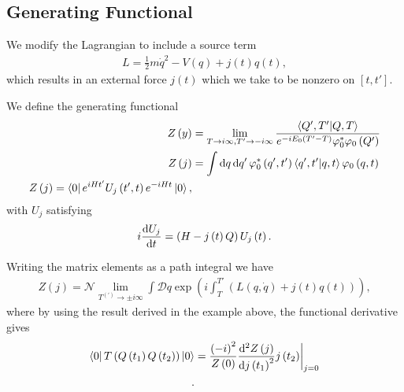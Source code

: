 \subsection{Generating Functional}

We modify the Lagrangian to include a source term
\begin{align*}
    L = \frac{1}{2}m\dot{q}^2 - V\left( q \right) + j\left( t \right) q\left( t \right) 
,\end{align*}
which results in an external force $j\left( t \right) $ which we take to be nonzero on $\left[ t,t' \right] $.

We define the generating functional
\begin{align*}
    Z\left( y \right) &= \lim_{T \to i \infty, T' \to -i\infty} \frac{\bra{Q',T'}\ket{Q,T}}{e^{-i E_0 \left( T' - T \right) }\phi_0^{*} \phi_0 \left( Q' \right) }\\
    Z\left( j \right) &= \int \dd{q} \dd{q'} \phi_0^{*}\left( q',t' \right) \bra{q', t'} \ket{q,t} \phi_0 \left( q,t \right)  \\
    Z\left( j \right) = \bra{0} e^{i Ht'} U_j \left( t',t \right) e^{-i H t} \ket{0}
,\end{align*}
with $U_j$ satisfying
\begin{align*}
    i \dv{U_j}{t} = \left( H - j\left( t \right) Q \right) U_j \left( t \right)
.\end{align*}

Writing the matrix elements as a path integral we have
\begin{align*}
    Z\left( j \right) = \mathcal{N} \lim_{T^{\left( ' \right) } \to \pm i\infty} \int \mathcal{D}q \exp \left( i \int_T^{T'} \left( L\left( q,\dot{q} \right) + j \left( t \right) q\left( t \right)  \right)  \right) 
,\end{align*}
where by using the result derived in the example above, the functional derivative gives
\begin{align*}
    \bra{0} T \left( Q\left( t_1 \right) Q\left( t_2 \right)  \right)  \ket{0} &= \frac{\left( -i \right)^2}{Z\left( 0 \right) } \dv[2]{Z\left( j \right) }{j\left( t_1 \right)}{j\left( t_2 \right) } \bigg|_{j = 0} \\
.\end{align*}
